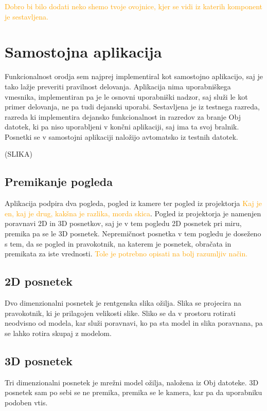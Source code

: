 \documentclass[a4paper, 12pt]{book}
\begin{document}
\textcolor{orange}{Dobro bi bilo dodati neko shemo tvoje ovojnice, kjer se vidi iz katerih komponent je sestavljena.}

\section{Samostojna aplikacija}

Funkcionalnost orodja sem najprej implementiral kot samostojno aplikacijo, saj je tako lažje preveriti pravilnost delovanja. Aplikacija nima uporabniškega vmesnika, implementiran pa je le osnovni uporabniški nadzor, saj služi le kot primer delovanja, ne pa tudi dejanski uporabi. Sestavljena je iz testnega razreda, razreda ki implementira dejansko funkcionalnost in razredov za branje Obj datotek, ki pa niso uporabljeni v končni aplikaciji, saj ima ta svoj bralnik. Posnetki se v samostojni aplikaciji naložijo avtomatsko iz testnih datotek.

(SLIKA)

\subsection*{Premikanje pogleda}

Aplikacija podpira dva pogleda, pogled iz kamere ter pogled iz projektorja \textcolor{orange}{Kaj je en, kaj je drug, kakšna je razlika, morda skica}. Pogled iz projektorja je namenjen poravnavi 2D in 3D posnetkov, saj je v tem pogledu 2D posnetek pri miru, premika pa se le 3D posnetek. Nepremičnost posnetka v tem pogledu je doseženo s tem, da se pogled in pravokotnik, na katerem je posnetek, obračata in premikata za iste vrednosti. 
\textcolor{orange}{Tole je potrebno opisati na bolj razumljiv način.}

\subsection*{2D posnetek}

Dvo dimenzionalni posnetek je rentgenska slika ožilja. Slika se projecira na pravokotnik, ki je prilagojen velikosti slike. Sliko se da v prostoru rotirati neodvisno od modela, kar služi poravnavi, ko pa sta model in slika poravnana, pa se lahko rotira skupaj z modelom.

\subsection*{3D posnetek}

Tri dimenzionalni posnetek je mrežni model ožilja, naložena iz Obj datoteke. 3D posnetek sam po sebi se ne premika, premika se le kamera, kar pa da uporabniku podoben vtis.
\end{document}
